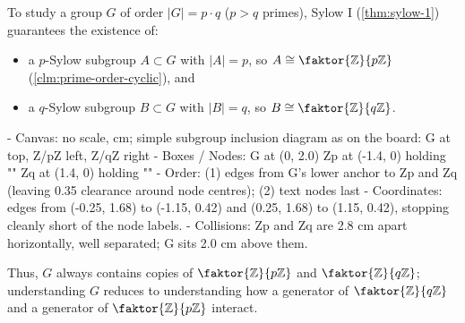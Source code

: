 \begin{content}
To study a group $G$ of order $|G| = p \cdot q$ ($p > q$ primes), Sylow I (\cref{thm:sylow-1}) guarantees the existence of:
\begin{itemize}
    \item a $p$-Sylow subgroup $A \subset G$ with $|A| = p$, so $A \cong \faktor{\mathbb{Z}}{p\mathbb{Z}}$ (\cref{clm:prime-order-cyclic}), and
    \item a $q$-Sylow subgroup $B \subset G$ with $|B| = q$, so $B \cong \faktor{\mathbb{Z}}{q\mathbb{Z}}$.
\end{itemize}

\begin{hidden}
- Canvas: no scale, cm; simple subgroup inclusion diagram as on the board: G at top, Z/pZ left, Z/qZ right
- Boxes / Nodes:
  G at (0, 2.0)
  Zp at (-1.4, 0) holding ""
  Zq at (1.4, 0) holding ""
- Order: (1) edges from G's lower anchor to Zp and Zq (leaving 0.35 clearance around node centres); (2) text nodes last
- Coordinates: edges from (-0.25, 1.68) to (-1.15, 0.42) and (0.25, 1.68) to (1.15, 0.42), stopping cleanly short of the node labels.
- Collisions: Zp and Zq are 2.8 cm apart horizontally, well separated; G sits 2.0 cm above them.
\end{hidden}
\begin{center}
\end{center}

Thus, $G$ always contains copies of $\faktor{\mathbb{Z}}{p\mathbb{Z}}$ and $\faktor{\mathbb{Z}}{q\mathbb{Z}}$; understanding $G$ reduces to understanding how a generator of $\faktor{\mathbb{Z}}{q\mathbb{Z}}$ and a generator of $\faktor{\mathbb{Z}}{p\mathbb{Z}}$ interact.
\end{content}

